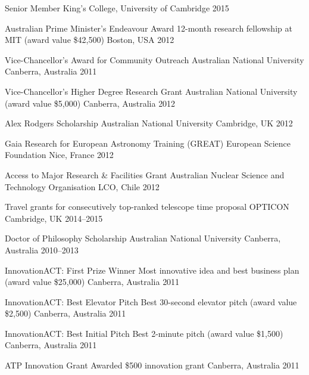 


\begin{cvhonors}

  \cvhonor
    {Senior Member} 
    {King's College, University of Cambridge}
    {}
    {2015} 
    
  \cvhonor
    {Australian Prime Minister's Endeavour Award}
    {12-month research fellowship at MIT (award value \$42,500)}
    {Boston, USA}
    {2012}

  \cvhonor
    {Vice-Chancellor's Award for Community Outreach}
    {Australian National University}
    {Canberra, Australia}
    {2011}

  \cvhonor
  	{Vice-Chancellor's Higher Degree Research Grant}
	{Australian National University (award value \$5,000)}
	{Canberra, Australia}
	{2012}
	
  \cvhonor
  	{Alex Rodgers Scholarship}
	{Australian National University}
	{Cambridge, UK}
	{2012}
	
  \cvhonor
  	{Gaia Research for European Astronomy Training (GREAT)}
	{European Science Foundation}
	{Nice, France}
	{2012}
	
  \cvhonor
  	{Access to Major Research \& Facilities Grant}
	{Australian Nuclear Science and Technology Organisation}
	{LCO, Chile}
	{2012}
		
  \cvhonor
  	{Travel grants for consecutively top-ranked telescope time proposal}
	{OPTICON}
	{Cambridge, UK}
	{2014--2015}
	
  \cvhonor
  	{Doctor of Philosophy Scholarship}
	{Australian National University}
	{Canberra, Australia}
	{2010--2013}
	
\end{cvhonors}

\vspace{1em}


\begin{cvhonors}

  \cvhonor
    {InnovationACT: First Prize Winner}
    {Most innovative idea and best business plan (award value \$25,000)}
    {Canberra, Australia}
    {2011}

  \cvhonor
    {InnovationACT: Best Elevator Pitch}
    {Best 30-second elevator pitch (award value \$2,500)}
    {Canberra, Australia}
    {2011}

  \cvhonor
    {InnovationACT: Best Initial Pitch}
    {Best 2-minute pitch (award value \$1,500)}
    {Canberra, Australia}
    {2011}

  \cvhonor
    {ATP Innovation Grant}
    {Awarded \$500 innovation grant}
    {Canberra, Australia}
    {2011}

\end{cvhonors}

